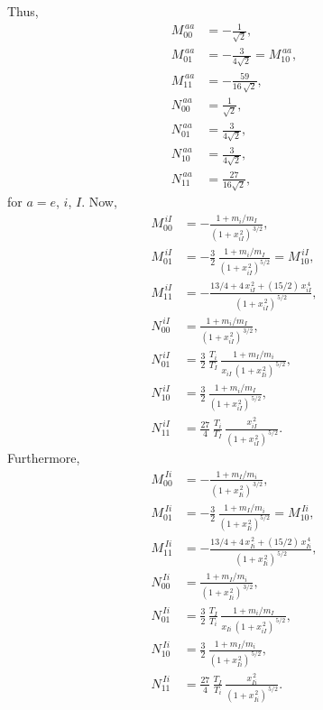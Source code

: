 \documentclass[notitlepage,12pt]{article}
\begin{document}
Thus, 
\begin{align}
M^{\,aa}_{00} &= -\frac{1}{\sqrt{2}},\\[0.5ex]
M^{\,aa}_{01}&= -\frac{3}{4\sqrt{2}}= M^{\,aa}_{10},\\[0.5ex]
M^{\,aa}_{11}& = -\frac{59}{16\,\sqrt{2}},\\[0.5ex]
N^{\,aa}_{00} &= \frac{1}{\sqrt{2}},\\[0.5ex]
N^{\,aa}_{01}&= \frac{3}{4\sqrt{2}},\\[0.5ex]
N^{\,aa}_{10}&=\frac{3}{4\sqrt{2}},\\[0.5ex]
N^{\,aa}_{11}& =\frac{27}{16\sqrt{2}},
\end{align}
for $a=e$, $i$, $I$.  Now, 
\begin{align}
M^{\,iI}_{00} &= -\frac{1+m_i/m_I}{(1+x_{iI}^{\,2})^{\,3/2}},\\[0.5ex]
M^{\,iI}_{01}&= -\frac{3}{2}\,\frac{1+m_i/m_I}{(1+x_{iI}^{\,2})^{5/2}}= M^{\,iI}_{10},\\[0.5ex]
M^{\,iI}_{11}& = -\frac{13/4+4\,x_{iI}^{\,2}+(15/2)\,x_{iI}^{\,4}}{(1+x_{iI}^{\,2})^{\,5/2}},\\[0.5ex]
N^{\,iI}_{00} &= \frac{1+m_i/m_I}{(1+x_{iI}^{\,2})^{\,3/2}},\\[0.5ex]
N^{\,iI}_{01}&= \frac{3}{2}\,\frac{T_i}{T_I}\,\frac{1+m_I/m_i}{x_{iI}\,(1+x_{Ii}^{\,2})^{\,5/2}},\\[0.5ex]
N^{\,iI}_{10}&=\frac{3}{2}\,\frac{1+m_i/m_I}{(1+x_{iI}^{\,2})^{\,5/2}},\\[0.5ex]
N^{\,iI}_{11}& =\frac{27}{4}\,\frac{T_i}{T_I}\,\frac{x_{iI}^{\,2}}{(1+x_{iI}^{\,2})^{\,5/2}}.
\end{align}
Furthermore, 
\begin{align}
M^{\,Ii}_{00} &= -\frac{1+m_I/m_i}{(1+x_{Ii}^{\,2})^{\,3/2}},\\[0.5ex]
M^{\,Ii}_{01}&= -\frac{3}{2}\,\frac{1+m_I/m_i}{(1+x_{Ii}^{\,2})^{5/2}}= M^{\,Ii}_{10},\\[0.5ex]
M^{\,Ii}_{11}& = -\frac{13/4+4\,x_{Ii}^{\,2}+(15/2)\,x_{Ii}^{\,4}}{(1+x_{Ii}^{\,2})^{\,5/2}},\\[0.5ex]
N^{\,Ii}_{00} &= \frac{1+m_I/m_i}{(1+x_{Ii}^{\,2})^{\,3/2}},\\[0.5ex]
N^{\,Ii}_{01}&= \frac{3}{2}\,\frac{T_I}{T_i}\,\frac{1+m_i/m_I}{x_{Ii}\,(1+x_{iI}^{\,2})^{\,5/2}},\\[0.5ex]
N^{\,Ii}_{10}&=\frac{3}{2}\,\frac{1+m_I/m_i}{(1+x_{Ii}^{\,2})^{\,5/2}},\\[0.5ex]
N^{\,Ii}_{11}& =\frac{27}{4}\,\frac{T_I}{T_i}\,\frac{x_{Ii}^{\,2}}{(1+x_{Ii}^{\,2})^{\,5/2}}.
\end{align}
\end{document}
